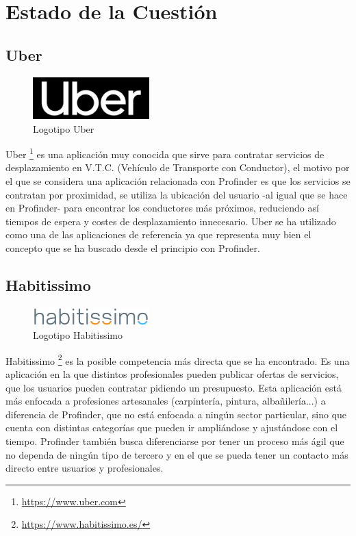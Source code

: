 \chapter{Estado de la Cuestión}
\label{cap:estadoDeLaCuestion}

\section{Uber}
\begin{figure}[h]
	\centering
	\includegraphics[width = 0.4\textwidth]{Imagenes/Fuentes/logo_Uber.png}
	\caption{Logotipo Uber}
	\label{fig:uber_logo}
\end{figure}
Uber \footnote{\url{https://www.uber.com}} es una aplicación muy conocida que sirve para contratar servicios de desplazamiento en V.T.C. (Vehículo de Transporte con Conductor), el motivo por el que se considera una aplicación relacionada con Profinder es que los servicios se contratan por proximidad, se utiliza la ubicación del usuario -al igual que se hace en Profinder- para encontrar los conductores más próximos, reduciendo así tiempos de espera y costes de desplazamiento innecesario. Uber se ha utilizado como una de las aplicaciones de referencia ya que representa muy bien el concepto que se ha buscado desde el principio con Profinder.

\section{Habitissimo}
\begin{figure}[h]
	\centering
	\includegraphics[width = 0.4\textwidth]{Imagenes/Fuentes/habitissimo_logo.jpg}
	\caption{Logotipo Habitissimo}
	\label{fig:habitissimo_logo}
\end{figure}
Habitissimo \footnote{\url{https://www.habitissimo.es/}} es la posible competencia más directa que se ha encontrado. Es una aplicación en la que distintos profesionales pueden publicar ofertas de servicios, que los usuarios pueden contratar pidiendo un presupuesto. Esta aplicación está más enfocada a profesiones artesanales (carpintería, pintura, albañilería...) a diferencia de Profinder, que no está enfocada a ningún sector particular, sino que cuenta con distintas categorías que pueden ir ampliándose y ajustándose con el tiempo. Profinder también busca diferenciarse por tener un proceso más ágil que no dependa de ningún tipo de tercero y en el que se pueda tener un contacto más directo entre usuarios y profesionales. 

